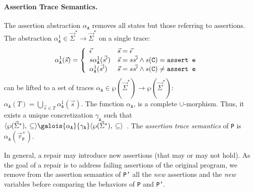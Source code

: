 \documentclass[10pt]{sigplanconf}
\newcommand{\code}[1]{\texttt{#1}}
\newcommand{\ltuple}[1]{\langle#1,\allowbreak}
\newcommand{\rtuple}[1]{\:#1\rangle}
\newcommand{\pair}[2]{\ltuple{#1}\rtuple{#2}}
\newcommand{\diff}[2]{\delta_{\code{#1}, \code{#2}}}
\newcommand{\emptytrace}{\vec{\epsilon}}
\begin{document}
\paragraph{Assertion Trace Semantics.}
The assertion abstraction $\alpha_\code{A}$ removes all states but those referring to assertions.
The abstraction $\alpha^1_\code{A} \in \vec{\Sigma}^\ast \rightarrow \vec{\Sigma}^\ast$ on a single trace:
\[
\alpha^1_\code{A}(\vec{s}) = \left\{
\begin{array}{l l}
  \emptytrace                 & \vec{s} = \emptytrace \\
  s\alpha^1_\code{A}(\vec{s'}) &  \vec{s} = s\vec{s'} \wedge s(\code{C}) = \code{assert e} \\
  \alpha^1_\code{A}(\vec{s'})  & \vec{s} = s\vec{s'} \wedge s(\code{C}) \not= \code{assert e}
\end{array}
\right.
\]
can be lifted to a set of traces $\alpha_\code{A} \in \wp(\vec{\Sigma}^\ast) \rightarrow \wp(\vec{\Sigma}^\ast)$: 
\(
\alpha_\code{A}(T) = \bigcup_{\vec{s} \in T} \alpha^1_\code{A}(\vec{s}).
\)
The function $\alpha_\code{A}$, is a complete $\cup$-morphism.
Thus, it exists a unique concretization $\gamma_\code{A}$ such that $\pair{\wp(\vec{\Sigma}^\ast)}{\subseteq}\galois{{\alpha_\code{A}}}{{\gamma_\code{A}}}\pair{\wp(\vec{\Sigma}^\ast)}{\subseteq}$~\cite{CousotCousot77}.
The \emph{assertion trace semantics} of \code{P} is $\alpha_\code{A}(\vec{\tau}^+_\code{P})$.

In general, a repair may introduce new assertions (that may or may not
hold).  As the goal of a repair is to address failing assertions of
the original program, we remove from the assertion semantics of
\code{P'} all the \emph{new} assertions and the \emph{new} variables
before comparing the behaviors of \code{P} and \code{P'}.

\end{document}
